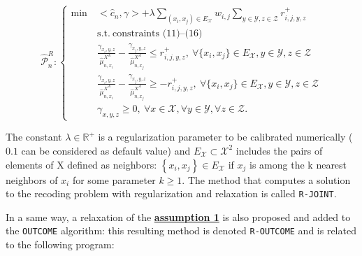 \begin{equation}
 \widehat{\mathcal{P}}^R_n:    \left\{
     \begin{aligned}
          \min\: & <\widehat{c}_n,\gamma> + \lambda \sum_{(x_i,x_j)\in E_\mathcal{X}}      w_{i,j}\sum_{y\in\mathcal{Y},z\in\mathcal{Z}} r^+_{i,j,y,z}\\
            &\text{s.t.}\: \text{constraints }  \text{(11)--(16)} \\
            & \frac{\gamma_{x_i,y,z}}{\hat{\mu}^{X^A}_{n,x_i}}-\frac{\gamma_{x_j,y,z}}{\hat{\mu}^{X^A}_{n,x_j}} \leq r^+_{i,j,y,z}, \:\forall \{x_i,x_j\}\in E_\mathcal{X}, y\in\mathcal{Y}, z\in \mathcal{Z}\\
            &  \frac{\gamma_{x_i,y,z}}{\hat{\mu}^{X^A}_{n,x_i}}-\frac{\gamma_{x_j,y,z}}{\hat{\mu}^{X^A}_{n,x_j}} \geq -r^+_{i,j,y,z}, \:\forall \{x_i,x_j\}\in E_\mathcal{X}, y\in\mathcal{Y}, z\in \mathcal{Z}\\
             & \gamma_{x,y,z} \geq 0,  \:\forall x\in\mathcal{X}, \forall y\in \mathcal{Y}, \forall z\in \mathcal{Z}.
     \end{aligned}\right.
 \label{eq:estimatemodelregularization}
 \end{equation}

The constant \(\lambda\in\mathbb{R}^+\) is a regularization parameter to be calibrated numerically (\(0.1\) can be considered as default value) and \(E_\mathcal{X}\subset \mathcal{X}^2\) includes the pairs of elements of X defined as neighbors: \(\left\{x_i, x_j\right\}\in E_\mathcal{X}\) if \(x_j\) is among the k nearest neighbors of \(x_i\) for some parameter \(k \geq 1\). The method that computes a solution to the recoding problem with regularization and relaxation is called \texttt{R-JOINT}.

In a same way, a relaxation of the \protect\hyperlink{optt}{\textbf{assumption 1}} is also proposed and added to the \texttt{OUTCOME} algorithm: this resulting method is denoted \texttt{R-OUTCOME} and is related to the following program:

